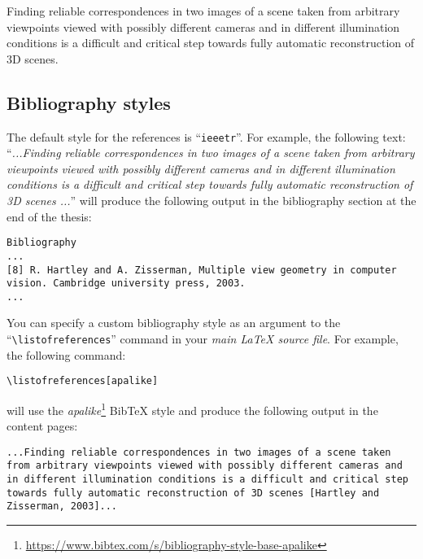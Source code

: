\lipsum[1]\cite{barker1987pulse,peacock1998oxygen,moller1993randomized}


Finding reliable correspondences in two images of a scene taken from arbitrary viewpoints viewed with possibly different cameras and in different illumination conditions is a difficult and critical step towards fully automatic reconstruction of 3D scenes\cite{hartley2003multiple}.


\lipsum[7]\cite{priya2012transition,haralick1973textural,Grass2012Online,NoninPulseOxOnline}


\subsection{Bibliography styles}


The default style for the references is ``\verb|ieeetr|''. For example, the following text: ``\textit{...Finding reliable correspondences in two images of a scene taken from arbitrary viewpoints viewed with possibly different cameras and in different illumination conditions is a difficult and critical step towards fully automatic reconstruction of 3D scenes \cite{hartley2003multiple}...}'' will produce the following output in the bibliography section at the end of the thesis:


\begin{lstlisting}[style=custom-text]
Bibliography
...
[8] R. Hartley and A. Zisserman, Multiple view geometry in computer vision. Cambridge university press, 2003.
...
\end{lstlisting}


You can specify a custom bibliography style as an argument to the ``\verb|\listofreferences|'' command in your \textit{main LaTeX source file}. For example, the following command:


\begin{lstlisting}[style=custom-latex]
\listofreferences[apalike]
\end{lstlisting}


\noindent will use the \textit{apalike}\footnote{\url{https://www.bibtex.com/s/bibliography-style-base-apalike}}
BibTeX style and produce the following output in the content pages:


\begin{lstlisting}[style=custom-text]
...Finding reliable correspondences in two images of a scene taken from arbitrary viewpoints viewed with possibly different cameras and in different illumination conditions is a difficult and critical step towards fully automatic reconstruction of 3D scenes [Hartley and Zisserman, 2003]...
\end{lstlisting}


